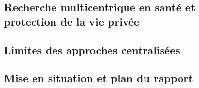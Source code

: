 
\subsection{Recherche multicentrique en santé et protection de la vie privée}
\label{sec:intro-contexte}

\subsection{Limites des approches centralisées}
\label{sec:intro-limites}

\subsection{Mise en situation et plan du rapport}
\label{sec:intro-plan}
